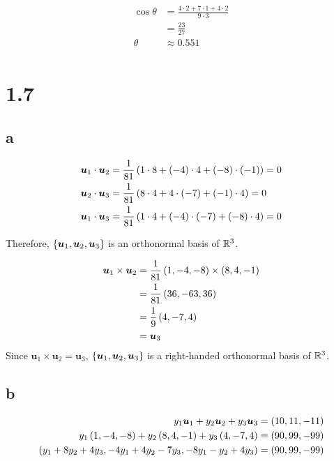 \documentclass{article}
\begin{document}
\begin{align*}
  \cos \theta &= \frac{4 \cdot 2 + 7 \cdot 1 + 4 \cdot 2}{9 \cdot 3} \\
              &= \frac{23}{27} \\
  \theta &\approx \boxed{0.551} \\
\end{align*}



\section*{1.7}

\subsection*{a}

\begin{align*}
  \bm{u}_1 \cdot \bm{u}_2 &= \frac{1}{81} \left ( 1 \cdot 8 + \left ( -4 \right) \cdot 4 + \left ( -8 \right) \cdot \left ( -1 \right) \right) = 0 \\
  \bm{u}_2 \cdot \bm{u}_3 &= \frac{1}{81} \left ( 8 \cdot 4 + 4 \cdot \left ( -7 \right) + \left ( -1 \right) \cdot 4 \right) = 0 \\
  \bm{u}_1 \cdot \bm{u}_3 &= \frac{1}{81} \left ( 1 \cdot 4 + \left ( -4 \right) \cdot \left ( -7 \right) + \left ( -8 \right) \cdot 4 \right) = 0 \\
\end{align*}

Therefore, $\left \{ \bm{u}_1, \bm{u}_2, \bm{u}_3 \right \}$ is an orthonormal basis of $\mathbb R^3$.

\begin{align*}
  \bm{u}_1 \times \bm{u}_2 &= \frac{1}{81} \left ( 1, -4, -8 \right) \times \left ( 8, 4, -1 \right) \\
                           &= \frac{1}{81} \left ( 36, -63, 36 \right) \\
                           &= \frac{1}{9} \left ( 4, -7, 4 \right) \\
                           &= \bm{u}_3 \\
\end{align*}
Since $\bm{u}_1 \times \bm{u}_2 = \bm{u}_3$, $\left \{ \bm{u}_1, \bm{u}_2, \bm{u}_3 \right \}$ is a right-handed orthonormal basis of $\mathbb R^3$.


\subsection*{b}


\begin{align*}
  y_1 \bm{u}_1 + y_2 \bm{u}_2 + y_3 \bm{u}_3 &= \left ( 10, 11, -11 \right) \\
  y_1 \left ( 1, -4, -8 \right) + y_2 \left ( 8, 4, -1 \right) + y_3 \left ( 4, -7, 4 \right) &= \left ( 90, 99, -99 \right) \\
  \left ( y_1 + 8 y_2 + 4 y_3, -4 y_1 + 4 y_2 - 7 y_3, -8 y_1 - y_2 + 4y_3 \right) &= \left ( 90, 99, -99 \right) \\
\end{align*}
\end{document}
